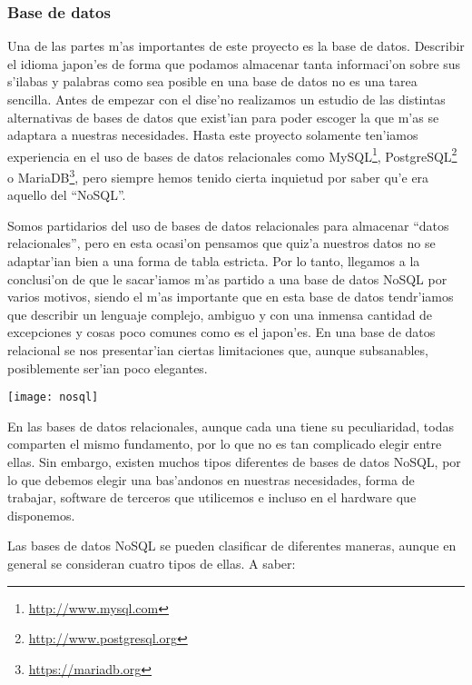 \subsubsection[Base de datos (FDB)]{Base de datos}
\label{sub:base_de_datos}
Una de las partes m'as importantes de este proyecto es la base de datos. Describir el idioma
japon'es de forma que podamos almacenar tanta informaci'on sobre sus s'ilabas y palabras
como sea posible en una base de datos no es una tarea sencilla. Antes de empezar con el dise'no
realizamos un estudio de las distintas alternativas de bases de datos que exist'ian para poder
escoger la que m'as se adaptara a nuestras necesidades. Hasta este proyecto solamente ten'iamos
experiencia en el uso de bases de datos relacionales como MySQL\footnote{\url{http://www.mysql.com}}, PostgreSQL\footnote{\url{http://www.postgresql.org}} o MariaDB\footnote{\url{https://mariadb.org}}, pero
siempre hemos tenido cierta inquietud por saber qu'e era aquello del ``NoSQL''.

Somos partidarios del uso de bases de datos relacionales
para almacenar ``datos relacionales'', pero en esta ocasi'on pensamos que quiz'a nuestros
datos no se adaptar'ian bien a una forma de tabla estricta. Por lo tanto, llegamos a la
conclusi'on de que le sacar'iamos m'as partido a una base de datos NoSQL por varios motivos,
siendo el m'as importante que en esta base de datos tendr'iamos que describir un lenguaje
complejo, ambiguo y con una inmensa cantidad de excepciones y cosas poco comunes como es
el japon'es. En una base de datos relacional se nos presentar'ian ciertas limitaciones que,
aunque subsanables, posiblemente ser'ian poco elegantes.

\vspace{2em}
\begin{center}
\texttt{[image: nosql]}
\end{center}

En las bases de datos relacionales, aunque cada una tiene su peculiaridad, todas comparten
el mismo fundamento, por lo que no es tan complicado elegir entre ellas. Sin embargo, existen
muchos tipos diferentes de bases de datos NoSQL, por lo que debemos elegir una
bas'andonos en nuestras necesidades, forma de trabajar, software de terceros que utilicemos e
incluso en el hardware que disponemos.

Las bases de datos NoSQL se pueden clasificar de diferentes maneras, aunque en general se consideran
cuatro tipos de ellas. A saber:

